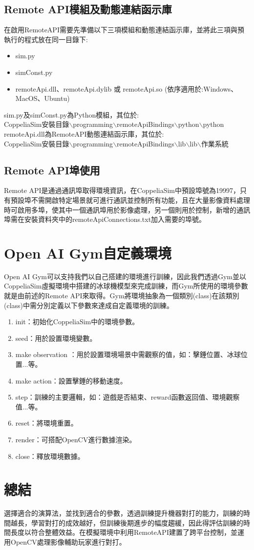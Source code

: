 \subsection{Remote API模組及動態連結函示庫}
在啟用RemoteAPI需要先準備以下三項模組和動態連結函示庫，並將此三項與預執行的程式放在同一目錄下:
\begin{itemize}
\item sim.py
\item simConst.py
\item remoteApi.dll、remoteApi.dylib 或 remoteApi.so (依序適用於:Windows、MacOS、Ubuntu)
\end{itemize}
sim.py及simConst.py為Python模組，其位於:\\
CoppeliaSim安裝目錄$\backslash$programming$\backslash$remoteApiBindings$\backslash$python$\backslash$python\\
remoteApi.dll為RemoteAPI動態連結函示庫，其位於:\\
CoppeliaSim安裝目錄$\backslash$programming$\backslash$remoteApiBindings$\backslash$lib$\backslash$lib$\backslash$作業系統\\
\subsection{Remote API埠使用}
Remote API是通過通訊埠取得環境資訊，在CoppeliaSim中預設埠號為19997，只有預設埠不需開啟特定場景就可進行通訊並控制所有功能，且在大量影像資料處理時可啟用多埠，使其中一個通訊埠用於影像處理，另一個則用於控制，新增的通訊埠需在安裝資料夾中的remoteApiConnections.txt加入需要的埠號。\\
\section{Open AI Gym自定義環境}
Open AI Gym可以支持我們以自己搭建的環境進行訓練，因此我們透過Gym並以CoppeliaSim虛擬環境中搭建的冰球機模型來完成訓練，而Gym所使用的環境參數就是由前述的Remote API來取得。Gym將環境抽象為一個類別(class)在該類別(class)中需分別定義以下參數來達成自定義環境的訓練。\\

\begin{enumerate}
\item init：初始化CoppeliaSim中的環境參數。
\item seed：用於設置環境變數。
\item make observation ：用於設置環境場景中需觀察的值，如：擊錘位置、冰球位置...等。
\item make action：設置擊錘的移動速度。
\item step：訓練的主要邏輯，如：遊戲是否結束、reward函數返回值、環境觀察值...等。
\item reset：將環境重置。
\item render：可搭配OpenCV進行數據渲染。
\item close：釋放環境數據。
\end{enumerate}

\section{總結}
選擇適合的演算法，並找到適合的參數，透過訓練提升機器對打的能力，訓練的時間越長，學習對打的成效越好，但訓練後期進步的幅度趨緩，因此得評估訓練的時間長度以符合整體效益。在模擬環境中利用RemoteAPI建置了跨平台控制，並運用OpenCV處理影像輔助玩家進行對打。
\newpage
